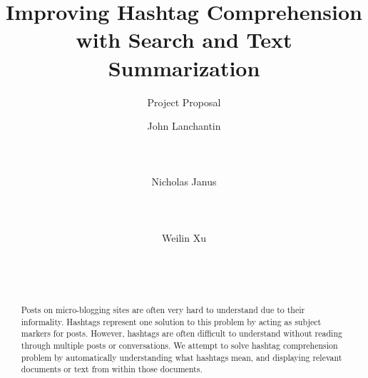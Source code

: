 \documentclass{sig-alternate}
\begin{document}
%

\title{Improving Hashtag Comprehension with Search and Text Summarization
}
\subtitle{Project Proposal}

\author{
\alignauthor
John Lanchantin\\
       \\
       \\
       \\
\alignauthor
Nicholas Janus\\
       \\
       \\
       \\
\alignauthor 
Weilin Xu\\
       \\
       \\
       \\
}

\maketitle
\begin{abstract}
Posts on micro-blogging sites are often very hard to understand due to their informality. Hashtags represent one solution to this problem by acting as subject markers for posts.  However, hashtags are often difficult to understand without reading through multiple posts or conversations. We attempt to solve hashtag comprehension problem by automatically understanding what hashtags mean, and displaying relevant documents or text from within those documents. 
\end{abstract}
\end{document}
